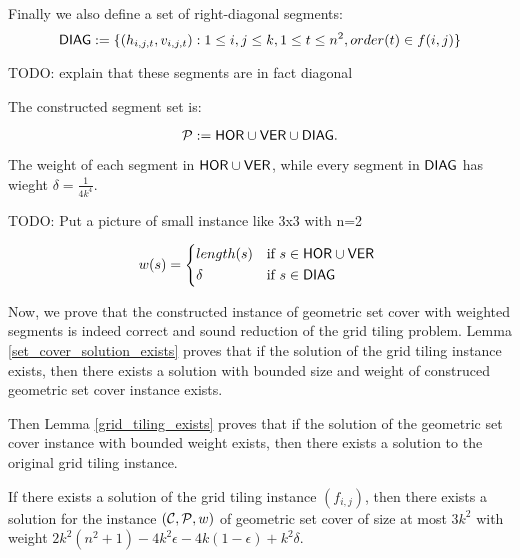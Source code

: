 Finally we also define a set of right-diagonal segments:
$$\mathsf{DIAG} := \{ (h_{i, j, t}, v_{i, j, t}) :
	1 \le i, j \le k, 1 \le t \le n^2, order(t) \in f(i, j)\}$$

TODO: explain that these segments are in fact diagonal

The constructed segment set is:

$$\mathcal{P} := \mathsf{HOR} \cup \mathsf{VER} \cup \mathsf{DIAG}.$$

The weight of each segment in $\mathsf{HOR} \cup \mathsf{VER}$,
while every segment in $\mathsf{DIAG}$ has wieght
$\delta = \frac{1}{4k^4}$.

TODO: Put a picture of small instance like 3x3 with n=2

\begin{equation}
w(s) =
	\begin{cases*}
	  length(s) 			& if $s \in \allhor \cup \allver$ \\
	  \delta        & if $s \in \alldiag$
	\end{cases*}
\end{equation}

\newcommand{\solWeight}{2k^2(n^2+1) - 4k^2\epsilon -4k(1-\epsilon) +k^2\delta }

Now, we prove that the constructed instance of geometric set cover
with weighted segments is indeed correct and sound reduction
of the grid tiling problem. Lemma \ref{set_cover_solution_exists}
proves that if the solution of the grid tiling instance exists,
then there exists a solution with bounded size and weight
of construced geometric set cover instance exists.

Then Lemma \ref{grid_tiling_exists} proves that if the solution
of the geometric set cover instance with bounded weight exists,
then there exists a solution to the original grid tiling instance.

\begin{lemma}
\label{set_cover_solution_exists}
	If there exists a solution of the grid tiling instance $(f_{i,j})$,
	then there exists a solution for the instance $(\mathcal{C}, \mathcal{P}, w)$
	of geometric set cover of size at most $3k^2$
	with weight $\solWeight$.
\end{lemma}

